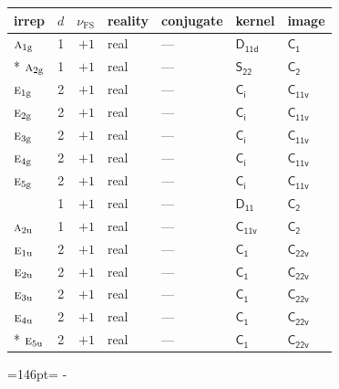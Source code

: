 \documentclass[10pt,a4paper]{article}
\newcommand{\needspace}[1]{\par\penalty-100\begingroup\dimen0=#1\relax\dimen2=\pagegoal
  \advance\dimen2-\pagetotal\ifdim\dimen0>\dimen2\relax\ifdim\dimen2>0pt\vfil\break\fi\fi
  \endgroup}
\numberwithin{equation}{section}
\newcommand{\grp}[1]{\mathsf{#1}}
\newcommand{\irr}[1]{\text{\normalfont\scshape #1}}
\newcommand{\detbox}[1]{{\setlength{\fboxsep}{1pt}\fbox{#1}}}
\newcommand{\ptag}[1]{\mathrm{#1}}
\newcommand{\fsind}{\nu_{\mathrm{FS}}}
\begin{document}
{\small\renewcommand{\arraystretch}{1.25}\begin{longtable}{@{}lrrllll@{}}\toprule
irrep & $d$ & $\fsind$ & reality & conjugate & kernel & image\\\midrule\endhead
\bottomrule\endfoot\endlastfoot
$\irr{a}_{1\ptag{g}}$ & 1 & $+1$ & real & --- & \href{D11d.pdf}{$\grp{D_{11d}}$} & \href{C1.pdf}{$\grp{C_{1}}$}\\*
$\irr{a}_{2\ptag{g}}$ & 1 & $+1$ & real & --- & \href{S22.pdf}{$\grp{S_{22}}$} & \href{C2.pdf}{$\grp{C_{2}}$}\\
$\irr{e}_{1\ptag{g}}$ & 2 & $+1$ & real & --- & \href{S2.pdf}{$\grp{C_{i}}$} & \href{C11v.pdf}{$\grp{C_{11v}}$}\\
$\irr{e}_{2\ptag{g}}$ & 2 & $+1$ & real & --- & \href{S2.pdf}{$\grp{C_{i}}$} & \href{C11v.pdf}{$\grp{C_{11v}}$}\\
$\irr{e}_{3\ptag{g}}$ & 2 & $+1$ & real & --- & \href{S2.pdf}{$\grp{C_{i}}$} & \href{C11v.pdf}{$\grp{C_{11v}}$}\\
$\irr{e}_{4\ptag{g}}$ & 2 & $+1$ & real & --- & \href{S2.pdf}{$\grp{C_{i}}$} & \href{C11v.pdf}{$\grp{C_{11v}}$}\\
$\irr{e}_{5\ptag{g}}$ & 2 & $+1$ & real & --- & \href{S2.pdf}{$\grp{C_{i}}$} & \href{C11v.pdf}{$\grp{C_{11v}}$}\\
\detbox{$\irr{a}_{1\ptag{u}}$} & 1 & $+1$ & real & --- & \href{D11.pdf}{$\grp{D_{11}}$} & \href{C2.pdf}{$\grp{C_{2}}$}\\
$\irr{a}_{2\ptag{u}}$ & 1 & $+1$ & real & --- & \href{C11v.pdf}{$\grp{C_{11v}}$} & \href{C2.pdf}{$\grp{C_{2}}$}\\
$\irr{e}_{1\ptag{u}}$ & 2 & $+1$ & real & --- & \href{C1.pdf}{$\grp{C_{1}}$} & $\grp{C_{22v}}$\\
$\irr{e}_{2\ptag{u}}$ & 2 & $+1$ & real & --- & \href{C1.pdf}{$\grp{C_{1}}$} & $\grp{C_{22v}}$\\
$\irr{e}_{3\ptag{u}}$ & 2 & $+1$ & real & --- & \href{C1.pdf}{$\grp{C_{1}}$} & $\grp{C_{22v}}$\\
$\irr{e}_{4\ptag{u}}$ & 2 & $+1$ & real & --- & \href{C1.pdf}{$\grp{C_{1}}$} & $\grp{C_{22v}}$\\*
$\irr{e}_{5\ptag{u}}$ & 2 & $+1$ & real & --- & \href{C1.pdf}{$\grp{C_{1}}$} & $\grp{C_{22v}}$\\
\bottomrule\end{longtable}}
\needspace{146pt}
\end{document}
